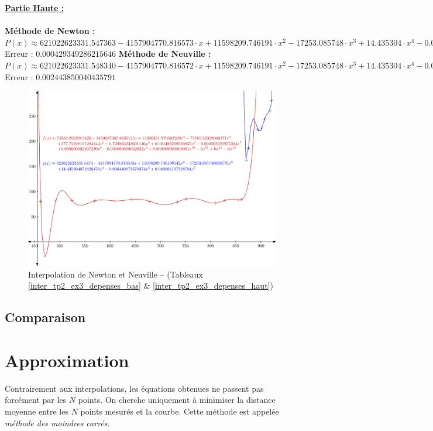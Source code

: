 \documentclass{report}
\begin{document}
	\noindent\underline{\textbf{Partie Haute :}} \\ \\
	\textbf{Méthode de Newton :}\\
	$P(x) \approx 621022623331.547363-4157904770.816573 \cdot x + 11598209.746191 \cdot x^{2} - 17253.085748 \cdot x^{3}  + 14.435304 \cdot x^{4} - 0.006441 \cdot x^{5}  + 0.000001 \cdot x^{6} $\\
	Erreur : $0.000429349286215646$
	\newline
	\newline
	\textbf{Méthode de Neuville :}\\
	$P(x) \approx 621022623331.548340-4157904770.816572 \cdot x + 11598209.746191 \cdot x^{2} - 17253.085748 \cdot x^{3}  + 14.435304 \cdot x^{4} - 0.006441 \cdot x^{5}  + 0.000001 \cdot x^{6} $\\
	Erreur : $0.002443850040435791$
      \newpage
      \begin{figure}[h]
	\centering
	\includegraphics[scale=0.85]{graphiques/pdf_output/inter_tp2_ex3.pdf}
	\caption{Interpolation de Newton et Neuville -- (Tableaux \ref{inter_tp2_ex3_depenses_bas} \& \ref{inter_tp2_ex3_depenses_haut})}
      \end{figure}
    \newpage
    \section{Comparaison}
  \chapter{Approximation}
    Contrairement aux interpolations, les équations obtenues ne passent pas forcément par les $N$ points. On cherche uniquement à minimiser la distance moyenne entre les $N$ points mesurés et la courbe. Cette méthode est appelée \textit{méthode des moindres carrés}.
\end{document}
